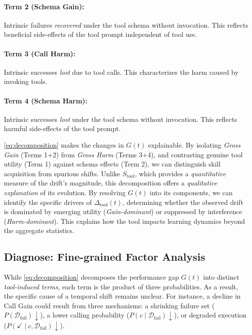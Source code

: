     \paragraph{Term 2 (Schema Gain):} Intrinsic failures \textit{recovered} under the tool schema without invocation. This reflects beneficial side-effects of the tool prompt independent of tool use.
    \paragraph{Term 3 (Call Harm):} Intrinsic successes \textit{lost} due to tool calls. This characterizes the harm caused by invoking tools.
    \paragraph{Term 4 (Schema Harm):} Intrinsic successes \textit{lost} under the tool schema without invocation. This reflects harmful side-effects of the tool prompt.

%
\cref{eq:decomposition} makes the changes in \( G (t) \) explainable.
%
By isolating \textit{Gross Gain} (Terms 1+2) from \textit{Gross Harm} (Terms 3+4), and contrasting genuine tool utility (Term 1) against schema effects (Term 2), we can distinguish skill acquisition from spurious shifts.
%
Unlike $ S_{\text{tool}} $, which provides a \textit{quantitative} measure of the drift's magnitude, this decomposition offers a \textit{qualitative explanation} of its evolution.
%
By resolving $ G(t) $ into its components, we can identify the specific drivers of $\Delta_{\mathrm{tool}}(t)$, determining whether the observed drift is dominated by emerging utility (\textit{Gain-dominant}) or suppressed by interference (\textit{Harm-dominant}).
%
This explains how the tool impacts learning dynamics beyond the aggregate statistics.
%
\subsection{Diagnose: Fine-grained Factor Analysis}

While \cref{eq:decomposition} decomposes the performance gap $G(t)$ into distinct \textit{tool-induced terms}, each term is the product of three probabilities.
%
As a result, the specific cause of a temporal shift remains unclear.
%
For instance, a decline in Call Gain could result from three mechanisms: a shrinking failure set ($P(\mathcal D_{\text{fail}})\downarrow$), a lower calling probability ($P(c \mid \mathcal D_{\text{fail}})\downarrow$), or degraded execution ($P(\checkmark \mid c, \mathcal D_{\text{fail}})\downarrow$).

